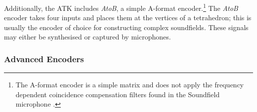 \documentclass{article}
\begin{document}
Additionally, the ATK includes \emph{AtoB}, a simple A-format encoder.\footnote{The A-format encoder is a simple matrix and does not apply the frequency dependent coincidence compensation filters found in the Soundfield microphone \cite{farrar:1979soundfield}.}
The \emph{AtoB} encoder takes four inputs and places them at the vertices of a tetrahedron; this is usually the encoder of choice for constructing complex soundfields. These signals may either be synthesised or captured by microphones.





\subsubsection{Advanced Encoders}\label{sec:impending-encoders}
\end{document}
